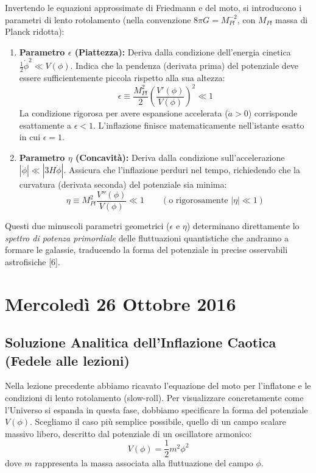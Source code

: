 \documentclass[11pt,a4paper]{report}
\begin{document}
Invertendo le equazioni approssimate di Friedmann e del moto, si introducono i parametri di lento rotolamento (nella convenzione $8\pi G = M_{Pl}^{-2}$, con $M_{Pl}$ massa di Planck ridotta):
\begin{enumerate}
    \item \textbf{Parametro $\epsilon$ (Piattezza):} Deriva dalla condizione dell'energia cinetica $\frac{1}{2}\dot{\phi}^2 \ll V(\phi)$. Indica che la pendenza (derivata prima) del potenziale deve essere sufficientemente piccola rispetto alla sua altezza:
    \begin{equation}
    \epsilon \equiv \frac{M_{Pl}^2}{2} \left( \frac{V'(\phi)}{V(\phi)} \right)^2 \ll 1
    \end{equation}
    La condizione rigorosa per avere espansione accelerata ($\ddot{a} > 0$) corrisponde esattamente a $\epsilon < 1$. L'inflazione finisce matematicamente nell'istante esatto in cui $\epsilon = 1$.
    \item \textbf{Parametro $\eta$ (Concavità):} Deriva dalla condizione sull'accelerazione $|\ddot{\phi}| \ll |3H\dot{\phi}|$. Assicura che l'inflazione perduri nel tempo, richiedendo che la curvatura (derivata seconda) del potenziale sia minima:
    \begin{equation}
    \eta \equiv M_{Pl}^2 \frac{V''(\phi)}{V(\phi)} \ll 1 \qquad (\text{o rigorosamente } |\eta| \ll 1)
    \end{equation}
\end{enumerate}
Questi due minuscoli parametri geometrici ($\epsilon$ e $\eta$) determinano direttamente lo \textit{spettro di potenza primordiale} delle fluttuazioni quantistiche che andranno a formare le galassie, traducendo la forma del potenziale in precise osservabili astrofisiche [6].

\chapter{Mercoledì 26 Ottobre 2016}

\section{Soluzione Analitica dell'Inflazione Caotica (Fedele alle lezioni)}

Nella lezione precedente abbiamo ricavato l'equazione del moto per l'inflatone e le condizioni di lento rotolamento (slow-roll). Per visualizzare concretamente come l'Universo si espanda in questa fase, dobbiamo specificare la forma del potenziale $V(\phi)$. 
Scegliamo il caso più semplice possibile, quello di un campo scalare massivo libero, descritto dal potenziale di un oscillatore armonico:
\begin{equation}
V(\phi) = \frac{1}{2}m^2 \phi^2
\end{equation}
dove $m$ rappresenta la massa associata alla fluttuazione del campo $\phi$. 
\end{document}
